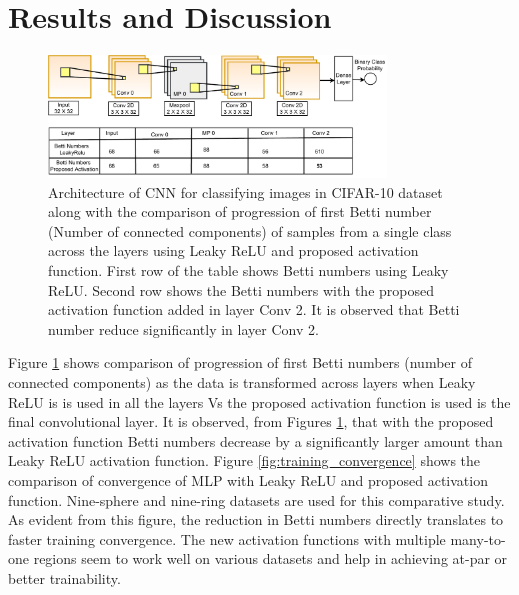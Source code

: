 \documentclass[wcp]{jmlr}
\begin{document}
\section{Results and Discussion}

\begin{figure}[htp]
\begin{center}
\includegraphics[width=0.8\textwidth]{images/cifar_10_arch.drawio}
\caption{Architecture of CNN for classifying images in CIFAR-10 dataset along with the comparison  of progression of first Betti number (Number of connected components) of samples from a single class across the layers using Leaky ReLU  and proposed activation function. First row of the table shows Betti numbers using Leaky ReLU. Second row shows the Betti numbers with the proposed activation function added in layer Conv 2. It is observed that Betti number reduce significantly in layer Conv 2.
}
\label{fig:cifar_10_arch}
\end{center}
\end{figure}


Figure \ref{fig:cifar_10_arch} shows  comparison of progression of first Betti numbers (number of connected components) as the data is transformed across layers when Leaky ReLU is is used in all the layers Vs the proposed activation function is used is the final convolutional layer.  It is observed, from Figures \ref{fig:cifar_10_arch},  that with the proposed activation function Betti numbers decrease  by a significantly larger amount than Leaky ReLU activation function. Figure \ref{fig:training_convergence} shows the comparison of convergence  of MLP with Leaky ReLU and proposed activation function. Nine-sphere and nine-ring datasets are used for this comparative study. As evident from this figure, the reduction in Betti numbers  directly translates to faster training convergence. The new activation functions with multiple many-to-one regions seem to work well on various datasets and help in achieving at-par or better trainability.
\end{document}
